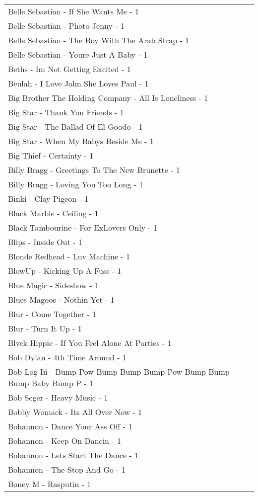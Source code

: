 \documentclass[
]{article}
\begin{document}
\begin{longtable}{l}
Belle Sebastian - If She Wants Me - 1 \\ 
Belle Sebastian - Photo Jenny - 1 \\ 
Belle Sebastian - The Boy With The Arab Strap - 1 \\ 
Belle Sebastian - Youre Just A Baby - 1 \\ 
Beths - Im Not Getting Excited - 1 \\ 
Beulah - I Love John She Loves Paul - 1 \\ 
Big Brother The Holding Company - All Is Loneliness - 1 \\ 
Big Star - Thank You Friends - 1 \\ 
Big Star - The Ballad Of El Goodo - 1 \\ 
Big Star - When My Babys Beside Me - 1 \\ 
Big Thief - Certainty - 1 \\ 
Billy Bragg - Greetings To The New Brunette - 1 \\ 
Billy Bragg - Loving You Too Long - 1 \\ 
Binki - Clay Pigeon - 1 \\ 
Black Marble - Ceiling - 1 \\ 
Black Tambourine - For ExLovers Only - 1 \\ 
Blips - Inside Out - 1 \\ 
Blonde Redhead - Luv Machine - 1 \\ 
BlowUp - Kicking Up A Fuss - 1 \\ 
Blue Magic - Sideshow - 1 \\ 
Blues Magoos - Nothin Yet - 1 \\ 
Blur - Come Together - 1 \\ 
Blur - Turn It Up - 1 \\ 
Blvck Hippie - If You Feel Alone At Parties - 1 \\ 
Bob Dylan - 4th Time Around - 1 \\ 
Bob Log Iii - Bump Pow Bump Bump Bump Pow Bump Bump Bump Baby Bump P - 1 \\ 
Bob Seger - Heavy Music - 1 \\ 
Bobby Womack - Its All Over Now - 1 \\ 
Bohannon - Dance Your Ass Off - 1 \\ 
Bohannon - Keep On Dancin - 1 \\ 
Bohannon - Lets Start The Dance - 1 \\ 
Bohannon - The Stop And Go - 1 \\ 
Boney M - Rasputin - 1 \\ 

\end{longtable}
\end{document}

